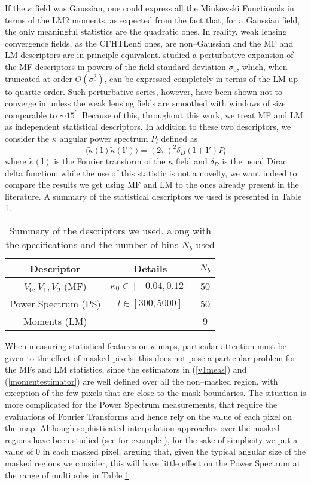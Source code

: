 \documentclass[reprint,aps,prd,superscriptaddress,showkeys,showpacs]{revtex4-1}
\begin{document}
%
If the $\kappa$ field was Gaussian, one could express all the Minkowski Functionals in terms of the LM2 moments, as expected from the fact that, for a Gaussian field, the only meaningful statistics are the quadratic ones. In reality, weak lensing convergence fields, as the CFHTLenS ones, are non--Gaussian and the MF and LM descriptors are in principle equivalent. \citep{Munshi12,Matsubara10} studied a perturbative expansion of the MF descriptors in powers of the field standard deviation $\sigma_0$, which, when truncated at order $O(\sigma_0^2)$, can be expressed completely in terms of the LM up to quartic order. Such perturbative series, however, have been shown not to converge in \citep{Petri2013} unless the weak lensing fields are smoothed with windows of size comparable to $\sim 15^\prime$. Because of this, throughout this work, we treat MF and LM as independent statistical descriptors. In addition to these two descriptors, we consider the $\kappa$ angular power spectrum $P_l$ defined as
\begin{equation}
\label{powerspectrum}
\langle\tilde{\kappa}(\mathbf{l})\tilde{\kappa}(\mathbf{l}')\rangle=(2\pi)^2\delta_D(\mathbf{l}+\mathbf{l}')P_l
\end{equation}  
%
where $\tilde{\kappa}(\mathbf{l})$ is the Fourier transform of the $\kappa$ field and $\delta_D$ is the usual Dirac delta function; while the use of this statistic is not a novelty, we want indeed to compare the results we get using MF and LM to the ones already present in the literature. A summary of the statistical descriptors we used is presented in Table \ref{desctable}. 
%
\begin{table}
\begin{tabular}{c|c|c} \hline
Descriptor & Details & $N_b$ \\ \hline
$V_0,V_1,V_2$ (MF) & $\kappa_0\in[-0.04,0.12]$ & 50 \\
Power Spectrum (PS) & $l \in [300,5000]$ & 50 \\
Moments (LM) & -- & 9 \\
\end{tabular}
\caption{Summary of the descriptors we used, along with the specifications and the number of bins $N_b$ used}
\label{desctable}
\end{table}
%
When measuring statistical features on $\kappa$ maps, particular attention must be given to the effect of masked pixels: this does not pose a particular problem for the MFs and LM statistics, since the estimators in (\ref{v1meas}) and (\ref{momentestimator}) are well defined over all the non--masked region, with exception of the few pixels that are close to the mask boundaries. The situation is more complicated for the Power Spectrum measurements, that require the evaluations of Fourier Transforms and hence rely on the value of each pixel on the map. Although sophisticated interpolation approaches over the masked regions have been studied (see for example \citep{VplasInterpolation}), for the sake of simplicity we put a value of 0 in each masked pixel, arguing that, given the typical angular size of the masked regions we consider, this will have little effect on the Power Spectrum at the range of multipoles in Table \ref{desctable}.  
\end{document}
